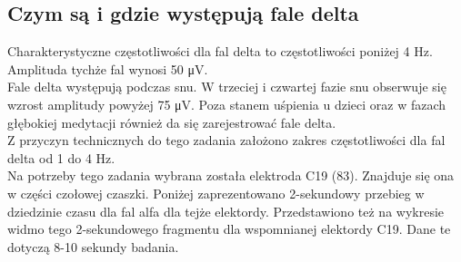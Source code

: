 \documentclass{article}
\begin{document}
    \subsection{Czym są i gdzie występują fale delta}

    Charakterystyczne częstotliwości dla fal delta to częstotliwości poniżej 4 Hz. Amplituda tychże fal wynosi 50 \si{\micro\volt}.\\

    Fale delta występują podczas snu. W trzeciej i czwartej fazie snu obserwuje się wzrost amplitudy powyżej 75 \si{\micro\volt}. Poza stanem uśpienia u dzieci oraz w fazach głębokiej medytacji również da się zarejestrować fale delta.\\

    Z przyczyn technicznych do tego zadania założono zakres częstotliwości dla fal delta od 1 do 4 Hz.\\

    Na potrzeby tego zadania wybrana została elektroda C19 (83). Znajduje się ona w części czołowej czaszki. Poniżej zaprezentowano 2-sekundowy przebieg w dziedzinie czasu dla fal alfa dla tejże elektordy. Przedstawiono też na wykresie widmo tego 2-sekundowego fragmentu dla wspomnianej elektordy C19. Dane te dotyczą 8-10 sekundy badania.

    \newpage
\end{document}
